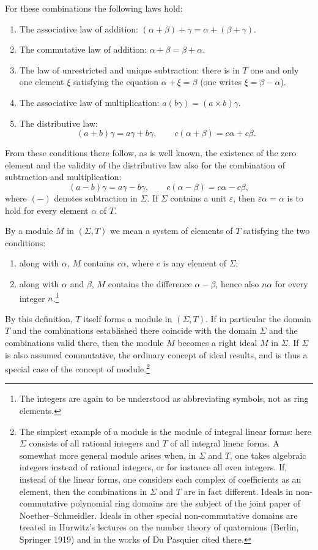 \documentclass[11pt]{article}
\begin{document}
For these combinations the following laws hold:
\begin{enumerate}
\item The associative law of addition: $(\alpha+\beta)+\gamma=\alpha+(\beta+\gamma)$.
\item The commutative law of addition: $\alpha+\beta=\beta+\alpha$.
\item The law of unrestricted and unique subtraction: there is in $T$ one and only one element $\xi$ satisfying the equation $\alpha+\xi=\beta$ (one writes $\xi=\beta-\alpha$).
\item The associative law of multiplication: $a(b\gamma)=(a\times b)\gamma$.
\item The distributive law:
\[
 (a+b)\gamma=a\gamma+b\gamma,
 \qquad
 c(\alpha+\beta)=c\alpha+c\beta.
\]
\end{enumerate}
From these conditions there follow, as is well known, the existence of the zero element and the validity of the distributive law also for the combination of subtraction and multiplication:
\[
 (a-b)\gamma=a\gamma-b\gamma,
 \qquad
 c(\alpha-\beta)=c\alpha-c\beta,
\]
where $(-)$ denotes subtraction in $\Sigma$. If $\Sigma$ contains a unit $\varepsilon$, then $\varepsilon\alpha=\alpha$ is to hold for every element $\alpha$ of $T$.

By a module $M$ in $(\Sigma,T)$ we mean a system of elements of $T$ satisfying the two conditions:
\begin{enumerate}
\item along with $\alpha$, $M$ contains $c\alpha$, where $c$ is any element of $\Sigma$;
\item along with $\alpha$ and $\beta$, $M$ contains the difference $\alpha-\beta$, hence also $n\alpha$ for every integer $n$.\footnote{The integers are again to be understood as abbreviating symbols, not as ring elements.}
\end{enumerate}
By this definition, $T$ itself forms a module in $(\Sigma,T)$. If in particular the domain $T$ and the combinations established there coincide with the domain $\Sigma$ and the combinations valid there, then the module $M$ becomes a right ideal $M$ in $\Sigma$. If $\Sigma$ is also assumed commutative, the ordinary concept of ideal results, and is thus a special case of the concept of module.\footnote{The simplest example of a module is the module of integral linear forms: here $\Sigma$ consists of all rational integers and $T$ of all integral linear forms. A somewhat more general module arises when, in $\Sigma$ and $T$, one takes algebraic integers instead of rational integers, or for instance all even integers. If, instead of the linear forms, one considers each complex of coefficients as an element, then the combinations in $\Sigma$ and $T$ are in fact different. Ideals in non-commutative polynomial ring domains are the subject of the joint paper of Noether--Schmeidler. Ideals in other special non-commutative domains are treated in Hurwitz's lectures on the number theory of quaternions (Berlin, Springer 1919) and in the works of Du Pasquier cited there.}
\end{document}
